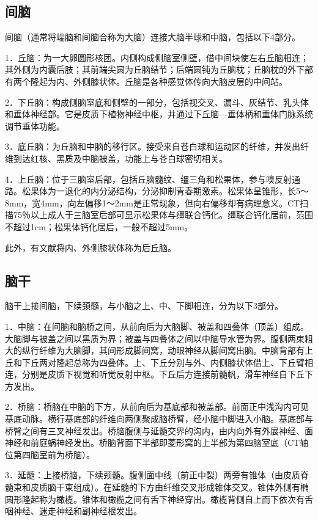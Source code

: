 \subsection{间脑}

间脑（通常将端脑和间脑合称为大脑）连接大脑半球和中脑，包括以下4部分。

1．丘脑：为一大卵圆形核团。内侧构成侧脑室侧壁，借中间块使左右丘脑相连；其外侧为内囊后肢；其前端尖圆为丘脑结节；后端圆钝为丘脑枕；丘脑枕的外下部有两个隆起为内、外侧膝状体。丘脑是各种感觉体传向大脑皮层的中间站。

2．下丘脑：构成侧脑室底和侧壁的一部分，包括视交叉、漏斗、灰结节、乳头体和垂体神经部。它是皮质下植物神经中枢，并通过下丘脑---垂体柄和垂体门脉系统调节垂体功能。

3．底丘脑：为丘脑和中脑的移行区。接受来自苍白球和运动区的纤维，并发出纤维到达红核、黑质及中脑被盖，功能上与苍白球密切相关。

4．上丘脑：位于三脑室后部，包括丘脑髓纹、缰三角和松果体，参与嗅反射通路。松果体为一退化的内分泌结构，分泌抑制青春期激素。松果体呈锥形，长5～8mm，宽4mm，向左偏移1～2mm是正常现象，但向右偏移却有病理意义。CT扫描75％以上成人于三脑室后部可显示松果体与缰联合钙化。缰联合钙化居前，范围不超过1cm；松果体钙化居后，一般不超过5mm。

此外，有文献将内、外侧膝状体称为后丘脑。

\subsection{脑干}

脑干上接间脑，下续颈髓，与小脑之上、中、下脚相连，分为以下3部分。

1．中脑：在间脑和脑桥之间，从前向后为大脑脚、被盖和四叠体（顶盖）组成。大脑脚与被盖之间以黑质为界；被盖与四叠体之间以中脑导水管为界。腹侧两束粗大的纵行纤维为大脑脚，其间形成脚间窝，动眼神经从脚间窝出脑。中脑背部有上丘和下丘两对隆起总称为四叠体。上、下丘分别与外、内侧膝状体借上、下丘臂相连，分别是皮质下视觉和听觉反射中枢。下丘后方连接前髓帆，滑车神经自下丘下方发出。

2．桥脑：桥脑在中脑的下方，从前向后为基底部和被盖部。前面正中浅沟内可见基底动脉。横行基底部的纤维向两侧聚成脑桥臂，经小脑中脚进入小脑。基底部与桥臂之间有三叉神经发出。桥脑腹侧与延髓交界的沟内，由内向外有外展神经、面神经和前庭蜗神经发出。桥脑背面下半部即菱形窝的上半部为第四脑室底（CT轴位第四脑室前为桥脑）。

3．延髓：上接桥脑，下续颈髓。腹侧面中线（前正中裂）两旁有锥体（由皮质脊髓束和皮质脑干束组成）。在延髓的下方由纤维交叉形成锥体交叉。锥体外侧有椭圆形隆起称为橄榄。锥体和橄榄之间有舌下神经穿出。橄榄背侧自上而下依次有舌咽神经、迷走神经和副神经根发出。

